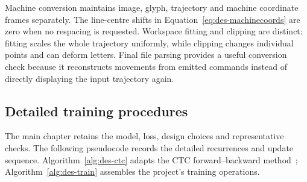 Machine conversion maintains image, glyph, trajectory and machine coordinate frames separately. The line-centre shifts in Equation~\ref{eq:des-machinecoords} are zero when no respacing is requested. Workspace fitting and clipping are distinct: fitting scales the whole trajectory uniformly, while clipping changes individual points and can deform letters. Final file parsing provides a useful conversion check because it reconstructs movements from emitted commands instead of directly displaying the input trajectory again.
\FloatBarrier

\subsection{Detailed training procedures}\label{app:des-training-procedures}
The main chapter retains the model, loss, design choices and representative checks. The following pseudocode records the detailed recurrences and update sequence. Algorithm~\ref{alg:des-ctc} adapts the CTC forward--backward method~\cite[PDF pp.~4--6]{graves2006}; Algorithm~\ref{alg:des-train} assembles the project's training operations.

\begin{designalgorithm}
\caption{Numerical CTC loss and logit gradient}
\label{alg:des-ctc}
\begin{designpseudo}
\end{designpseudo}
\end{designalgorithm}

